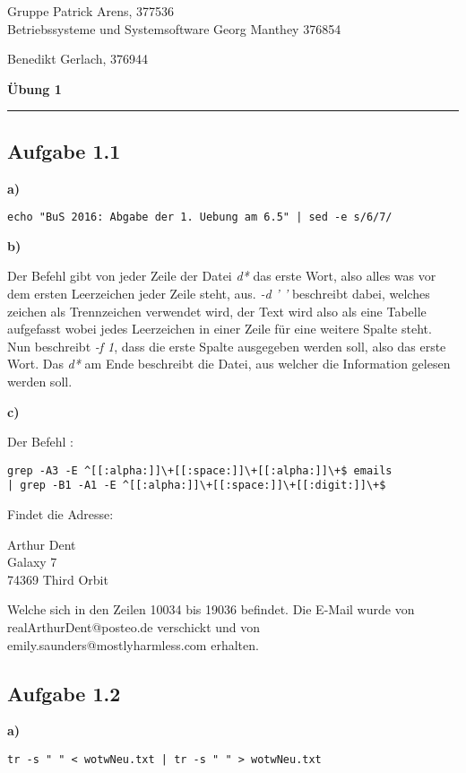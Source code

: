 \documentclass[a4paper,graphics,11pt]{article}
\newcommand{\aufgabe}[1]{\subsection*{Aufgabe #1}}
\begin{document}
\noindent Gruppe              \hfill Patrick Arens, 377536\\
\noindent Betriebssysteme und Systemsoftware    \hfill Georg Manthey 376854\\
\strut\hfill Benedikt Gerlach, 376944\\
\begin{center}
	\LARGE{\textbf{Übung 1}}
\end{center}
\begin{center}
\rule[0.1ex]{\textwidth}{1pt}
\end{center}

\aufgabe{1.1}
\textbf{a)}

\begin{verbatim}
echo "BuS 2016: Abgabe der 1. Uebung am 6.5" | sed -e s/6/7/
\end{verbatim}

\textbf{b)}

Der Befehl gibt von jeder Zeile der Datei \textit{d*} das erste Wort, also alles was vor dem ersten Leerzeichen jeder Zeile steht, aus. \textit{-d ' '} beschreibt dabei, welches zeichen als Trennzeichen verwendet wird, der Text wird also als eine Tabelle aufgefasst wobei jedes Leerzeichen in einer Zeile für eine weitere Spalte steht. Nun beschreibt \textit{-f 1}, dass die erste Spalte ausgegeben werden soll, also das erste Wort. Das \textit{d*} am Ende beschreibt die Datei, aus welcher die Information gelesen werden soll.


\textbf{c)}

Der Befehl :

\begin{verbatim}
grep -A3 -E ^[[:alpha:]]\+[[:space:]]\+[[:alpha:]]\+$ emails 
| grep -B1 -A1 -E ^[[:alpha:]]\+[[:space:]]\+[[:digit:]]\+$
\end{verbatim}



Findet die Adresse:

Arthur Dent\\
Galaxy 7\\
74369 Third Orbit

Welche sich in den Zeilen 10034 bis 19036 befindet. Die E-Mail wurde von realArthurDent@posteo.de verschickt und von emily.saunders@mostlyharmless.com erhalten.\\

\newpage

\aufgabe{1.2}
\textbf{a)}
\begin{verbatim}
tr -s " " < wotwNeu.txt | tr -s " " > wotwNeu.txt
\end{verbatim}
\end{document}
